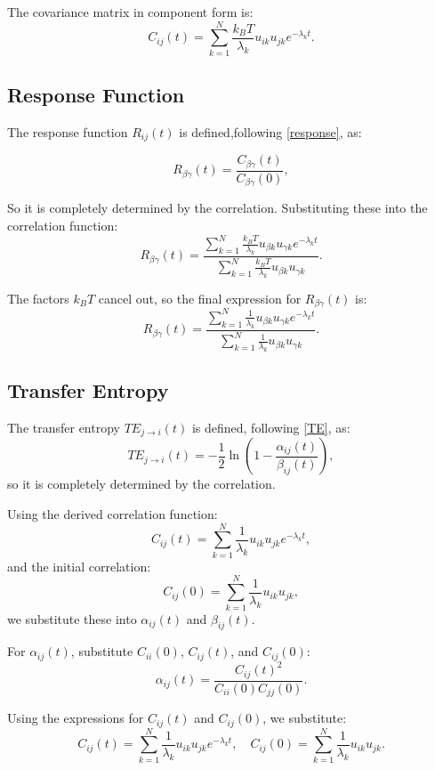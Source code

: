 \documentclass[English, Lau, oneside]{sapthesis}
\begin{document}
The covariance matrix in component form is:
\[
C_{ij}(t) = \sum_{k=1}^N \frac{k_B T}{\lambda_k} u_{ik} u_{jk} e^{-\lambda_k t}.
\]



\subsection {Response Function}

The response function \(R_{ij}(t)\) is defined,following \eqref{response}, as:\cite{ref13}

\begin{equation}
    R_{\beta\gamma}(t) = \frac{C_{\beta\gamma}(t)}{C_{\beta\gamma}(0)},
    \end{equation}
    
So it is completely determined by the correlation.
Substituting these into the correlation function:
\[
R_{\beta\gamma}(t) = \frac{\sum_{k=1}^N \frac{k_B T}{\lambda_k} u_{\beta k} u_{\gamma k} e^{-\lambda_k t}}{\sum_{k=1}^N \frac{k_B T}{\lambda_k} u_{\beta k} u_{\gamma k}}.
\]

The factors \(k_B T\) cancel out, so the final expression for \(R_{\beta\gamma}(t)\) is:
\[
R_{\beta\gamma}(t) = \frac{\sum_{k=1}^N \frac{1}{\lambda_k} u_{\beta k} u_{\gamma k} e^{-\lambda_k t}}{\sum_{k=1}^N \frac{1}{\lambda_k} u_{\beta k} u_{\gamma k}}.
\]


\subsection{Transfer Entropy}

The transfer entropy \(TE_{j \to i}(t)\) is defined, following \eqref{TE}, as:
\[
TE_{j \to i}(t) = -\frac{1}{2} \ln{\left(1 - \frac{\alpha_{ij}(t)}{\beta_{ij}(t)}\right)},
\]
so it is completely determined by the correlation.

Using the derived correlation function:
\[
C_{ij}(t) = \sum_{k=1}^N \frac{1}{\lambda_k} u_{ik} u_{jk} e^{-\lambda_k t},
\]
and the initial correlation:
\[
C_{ij}(0) = \sum_{k=1}^N \frac{1}{\lambda_k} u_{ik} u_{jk},
\]
we substitute these into \(\alpha_{ij}(t)\) and \(\beta_{ij}(t)\).

For \(\alpha_{ij}(t)\), substitute \(C_{ii}(0)\), \(C_{ij}(t)\), and \(C_{ij}(0)\):
\[
\alpha_{ij}(t) = \frac{C_{ij}(t)^2}{C_{ii}(0) C_{jj}(0)}.
\]

Using the expressions for \(C_{ij}(t)\) and \(C_{ij}(0)\), we substitute:
\[
C_{ij}(t) = \sum_{k=1}^N \frac{1}{\lambda_k} u_{ik} u_{jk} e^{-\lambda_k t}, \quad
C_{ij}(0) = \sum_{k=1}^N \frac{1}{\lambda_k} u_{ik} u_{jk}.
\]
\end{document}
